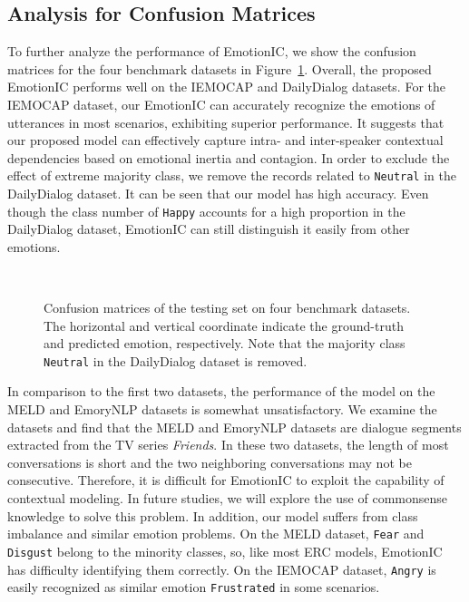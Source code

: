 \documentclass{SCIS2019}
\begin{document}
\subsection{Analysis for Confusion Matrices}
To further analyze the performance of EmotionIC, we show the confusion matrices for the four benchmark datasets in Figure~\ref{fig_confusion}. Overall, the proposed EmotionIC performs well on the IEMOCAP and DailyDialog datasets. For the IEMOCAP dataset, our EmotionIC can accurately recognize the emotions of utterances in most scenarios, exhibiting superior performance. It suggests that our proposed model can effectively capture intra- and inter-speaker contextual dependencies based on emotional inertia and contagion. In order to exclude the effect of extreme majority class, we remove the records related to \texttt{Neutral} in the DailyDialog dataset. It can be seen that our model has high accuracy. Even though the class number of \texttt{Happy} accounts for a high proportion in the DailyDialog dataset, EmotionIC can still distinguish it easily from other emotions.
\begin{figure}[htbp]
	\centering
	\hfil
\\
	\hfil
	\caption{Confusion matrices of the testing set on four benchmark datasets. The horizontal and vertical coordinate indicate the ground-truth and predicted emotion, respectively. Note that the majority class \texttt{Neutral} in the DailyDialog dataset is removed.}
	\label{fig_confusion}
\end{figure}

In comparison to the first two datasets, the performance of the model on the MELD and EmoryNLP datasets is somewhat unsatisfactory. We examine the datasets and find that the MELD and EmoryNLP datasets are dialogue segments extracted from the TV series \textit{Friends}. In these two datasets, the length of most conversations is short and the two neighboring conversations may not be consecutive. Therefore, it is difficult for EmotionIC to exploit the capability of contextual modeling. In future studies, we will explore the use of commonsense knowledge to solve this problem. In addition, our model suffers from class imbalance and similar emotion problems. On the MELD dataset, \texttt{Fear} and \texttt{Disgust} belong to the minority classes, so, like most ERC models, EmotionIC has difficulty identifying them correctly. On the IEMOCAP dataset, \texttt{Angry} is easily recognized as similar emotion \texttt{Frustrated} in some scenarios.
\end{document}

